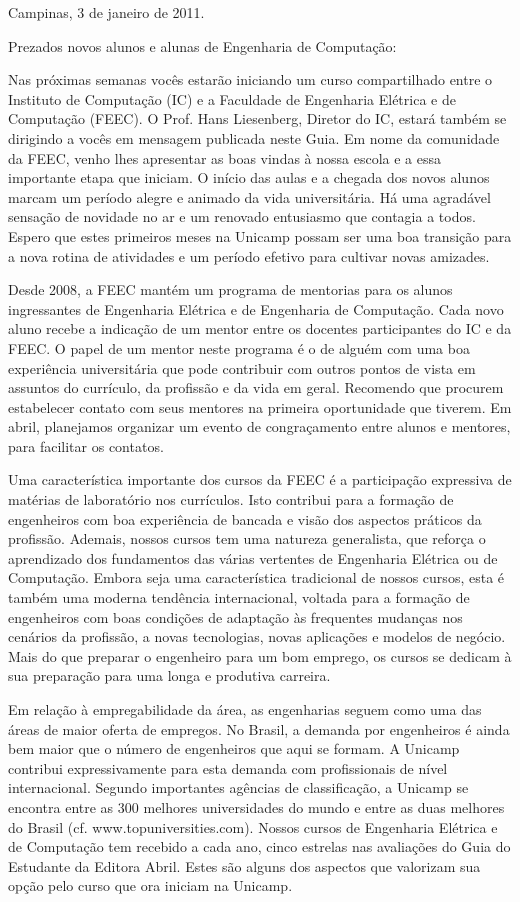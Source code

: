 Campinas, 3 de janeiro de 2011.

Prezados novos alunos e alunas de Engenharia de Computação:

Nas próximas semanas vocês estarão iniciando um curso compartilhado entre
o Instituto de Computação (IC) e a Faculdade de Engenharia Elétrica e de
Computação (FEEC). O Prof. Hans Liesenberg, Diretor do IC, estará também se
dirigindo a vocês em mensagem publicada neste Guia. Em nome da comunidade da
FEEC, venho lhes apresentar as boas vindas à nossa escola e a essa importante
etapa que iniciam. O início das aulas e a chegada dos novos alunos marcam um
período alegre e animado da vida universitária. Há uma agradável sensação de
novidade no ar e um renovado entusiasmo que contagia a todos. Espero que estes
primeiros meses na Unicamp possam ser uma boa transição para a nova rotina de
atividades e um período efetivo para cultivar novas amizades.  

Desde 2008, a FEEC mantém um programa de mentorias para os alunos ingressantes
de Engenharia Elétrica e de Engenharia de Computação. Cada novo aluno recebe
a indicação de um mentor entre os docentes participantes do IC e da FEEC.
O papel de um mentor neste programa é o de alguém com uma boa experiência
universitária que pode contribuir com outros pontos de vista em assuntos do
currículo, da profissão e da vida em geral. Recomendo que procurem estabelecer
contato com seus mentores na primeira oportunidade que tiverem. Em abril,
planejamos organizar um evento de congraçamento entre alunos e mentores, para
facilitar os contatos.

Uma característica importante dos cursos da FEEC é a participação expressiva de
matérias de laboratório nos currículos. Isto contribui para a formação de
engenheiros com boa experiência de bancada e visão dos aspectos práticos da
profissão. Ademais, nossos cursos tem uma natureza generalista, que reforça
o aprendizado dos fundamentos das várias vertentes de Engenharia Elétrica ou de
Computação. Embora seja uma característica tradicional de nossos cursos, esta
é também uma moderna tendência internacional, voltada para a formação de
engenheiros com boas condições de adaptação às frequentes mudanças nos cenários
da profissão, a novas tecnologias, novas aplicações e modelos de negócio. Mais
do que preparar o engenheiro para um bom emprego, os cursos se dedicam à sua
preparação para uma longa e produtiva carreira.

Em relação à empregabilidade da área, as engenharias seguem como uma das áreas
de maior oferta de empregos. No Brasil, a demanda por engenheiros é ainda bem
maior que o número de engenheiros que aqui se formam. A Unicamp contribui
expressivamente para esta demanda com profissionais de nível internacional.
Segundo importantes agências de classificação, a Unicamp se encontra entre as
300 melhores universidades do mundo e entre as duas melhores do Brasil (cf.
www.topuniversities.com). Nossos cursos de Engenharia Elétrica e de Computação
tem recebido a cada ano, cinco estrelas nas avaliações do Guia do Estudante da
Editora Abril. Estes são alguns dos aspectos que valorizam sua opção pelo curso
que ora iniciam na Unicamp.

